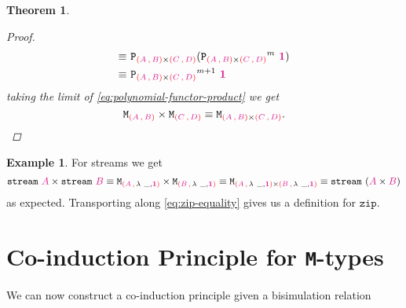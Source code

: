 \documentclass[twoside,11pt,openright]{report}
\theoremstyle{plain} %
\newtheorem{thm}{Theorem}[section]
\theoremstyle{definition}
\newtheorem{exmp}{Example}[section]
\theoremstyle{remark}
\newcommand*{\type}[1]{\textcolor{magenta!90!black}{#1}}
\newcommand*{\containerpair}[2]{\textcolor{red}{(}#1\,\textcolor{red}{,}\,#2\textcolor{red}{)}}
\newcommand*{\unit}{\type{\textbf{1}}}
\newcommand*{\function}[1]{\textcolor{blue!60!black}{\ensuremath{\mathtt{#1}}}}
\newcommand*{\typeformer}[1]{\ensuremath{\mathtt{#1}}}
\newcommand*{\functor}[1]{\ensuremath{\mathbf{\mathtt{#1}}}}
\begin{document}
\begin{thm}
\begin{proof}
\begin{align}
      \equiv&~ \functor{P}_{\containerpair{\type{A}}{\type{B}} \times \containerpair{\type{C}}{\type{D}}} ({\functor{P}_{\containerpair{\type{A}}{\type{B}} \times \containerpair{\type{C}}{\type{D}}}}^m~\unit) \\
      \equiv&~ {\functor{P}_{\containerpair{\type{A}}{\type{B}} \times \containerpair{\type{C}}{\type{D}}}}^{m+1}~\unit
    \end{align}
    taking the limit of \eqref{eq:polynomial-functor-product} we get
  \begin{equation}
    \typeformer{M}_{\containerpair{\type{A}}{\type{B}}} \times \typeformer{M}_{\containerpair{\type{C}}{\type{D}}} \equiv \typeformer{M}_{\containerpair{\type{A}}{\type{B}} \times \containerpair{\type{C}}{\type{D}}}.
  \end{equation}
  \end{proof}
\end{thm}
\begin{exmp} For streams we get
\begin{equation}
  \typeformer{stream}~\type{A} \times \typeformer{stream}~\type{B} \equiv \typeformer{M}_{\containerpair{\type{A}}{\lambda~\_,\unit}} \times \typeformer{M}_{\containerpair{\type{B}}{\lambda~\_,\unit}} \equiv \typeformer{M}_{\containerpair{\type{A}}{\lambda~\_,\unit} \times \containerpair{\type{B}}{\lambda~\_,\unit}} \equiv \typeformer{stream}~(\type{A} \times \type{B}) \label{eq:zip-equality}
\end{equation}
as expected. Transporting along \eqref{eq:zip-equality} gives us a definition for \function{zip}.
\end{exmp}

\section{Co-induction Principle for \texttt{M}-types}
We can now construct a co-induction principle given a bisimulation relation
\end{document}
